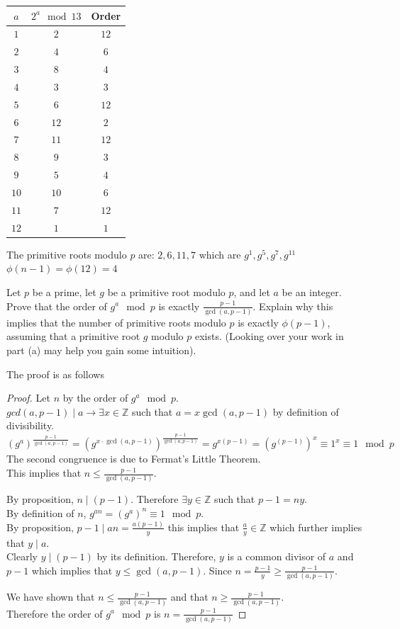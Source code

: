 \documentclass[12pt]{article}
\begin{document}
\solution
\begin{tabular}{|c|c|c|}
\hline
$a$ & $2^a \mod{13}$ & Order \\
\hline
$1$ & $2$ & $12$ \\
$2$ & $4$ & $6$ \\
$3$ & $8$ & $4$ \\
$4$ & $3$ & $3$ \\
$5$ & $6$ & $12$ \\
$6$ & $12$ & $2$ \\
$7$ & $11$ & $12$ \\
$8$ & $9$ & $3$ \\
$9$ & $5$ & $4$ \\
$10$ & $10$ & $6$ \\
$11$ & $7$ & $12$ \\
$12$ & $1$ & $1$ \\
\hline
\end{tabular}

\noindent
The primitive roots modulo $p$ are:
$2,6,11,7$ which are $g^1,g^5,g^7,g^{11}$
$\phi(n-1)=\phi(12)=4$

\clearpage
\subproblem Let $p$ be a prime, let $g$ be a primitive root modulo $p$, and let $a$ be an integer. Prove that the order of $g^a\mod{p}$ is exactly $\frac{p-1}{\gcd(a,p-1)}$. Explain why this implies that the number of primitive roots modulo $p$ is exactly $\phi(p-1)$, assuming that a primitive root $g$ modulo $p$ exists. (Looking over your work in part (a) may help you gain some intuition).

\solution The proof is as follows
\begin{proof}
Let $n$ by the order of $g^a\mod{p}$.\\
$gcd(a,p-1)\mid a\rightarrow\exists x\in\mathbb{Z}$ such that $a=x\gcd(a,p-1)$ by definition of divisibility.
\[\left(g^a\right)^{\frac{p-1}{\gcd(a,p-1)}}=\left(g^{x\cdot\gcd(a,p-1)}\right)^{\frac{p-1}{\gcd(a,p-1)}}=g^{x(p-1)}=\left(g^{(p-1)}\right)^x\equiv1^x\equiv1\mod{p}\]
The second congruence is due to Fermat's Little Theorem.\\
This implies that $n\leq\frac{p-1}{\gcd(a,p-1)}$.

\noindent
By proposition, $n\mid(p-1)$. Therefore $\exists y\in\mathbb{Z}$ such that $p-1=ny$.\\
By definition of $n$, $g^{an}=(g^a)^n\equiv1\mod{p}$.\\
By proposition, $p-1\mid an=\frac{a(p-1)}{y}$ this implies that $\frac{a}{y}\in\mathbb{Z}$ which further implies that $y\mid a$.\\
Clearly $y\mid (p-1)$ by its definition. Therefore, $y$ is a common divisor of $a$ and $p-1$ which implies that $y\leq\gcd(a,p-1)$.
Since $n=\frac{p-1}{y}\geq\frac{p-1}{\gcd(a,p-1)}$.

\noindent
We have shown that $n\leq\frac{p-1}{\gcd(a,p-1)}$ and that $n\geq\frac{p-1}{\gcd(a,p-1)}$.\\
Therefore the order of $g^a\mod{p}$ is $n=\frac{p-1}{\gcd(a,p-1)}$
\end{proof}
\end{document}
